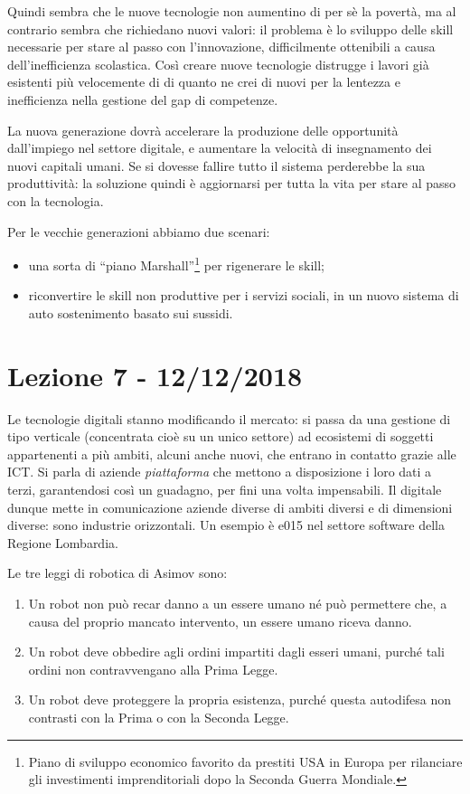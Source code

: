 \documentclass[a4page, 11pt]{article}
\begin{document}
Quindi sembra che le nuove tecnologie non aumentino di per sè la povertà, ma al contrario sembra che richiedano nuovi valori: il problema è lo sviluppo delle skill necessarie per stare al passo con l'innovazione, difficilmente ottenibili a causa dell'inefficienza scolastica.
Così  creare nuove tecnologie distrugge i lavori già esistenti più velocemente di di quanto ne crei di nuovi per la lentezza e inefficienza nella gestione del gap di competenze.

La nuova generazione dovrà accelerare la produzione delle opportunità dall'impiego nel settore digitale, e aumentare la velocità di insegnamento dei nuovi capitali umani.
Se si dovesse fallire tutto il sistema perderebbe la sua produttività: la soluzione quindi è aggiornarsi per tutta la vita per stare al passo con la tecnologia.

Per le vecchie generazioni abbiamo due scenari:
\begin{itemize}
  \item una sorta di ``piano Marshall''\footnote{Piano di sviluppo economico favorito da prestiti USA in Europa per rilanciare gli investimenti imprenditoriali dopo la Seconda Guerra Mondiale.} per rigenerare le skill;
  \item riconvertire le skill non produttive per i servizi sociali, in un nuovo sistema di auto sostenimento basato sui sussidi.
\end{itemize}


\section*{Lezione 7 - 12/12/2018}
Le tecnologie digitali stanno modificando il mercato: si passa da una gestione di tipo verticale (concentrata cioè su un unico settore) ad ecosistemi di soggetti appartenenti a più ambiti, alcuni anche nuovi, che entrano in contatto grazie alle ICT.
Si parla di aziende \textit{piattaforma} che mettono a disposizione i loro dati a terzi, garantendosi così un guadagno, per fini una volta impensabili.
Il digitale dunque mette in comunicazione aziende diverse di ambiti diversi e di dimensioni diverse: sono industrie orizzontali.
Un esempio è e015 nel settore software della Regione Lombardia.

Le tre leggi di robotica di Asimov sono:
\begin{enumerate}
  \def\labelenumi{\arabic{enumi}.}
  \item Un robot non può recar danno a un essere umano né può permettere che, a causa del proprio mancato intervento, un essere umano riceva danno.
  \item Un robot deve obbedire agli ordini impartiti dagli esseri umani, purché tali ordini non contravvengano alla Prima Legge.
  \item Un robot deve proteggere la propria esistenza, purché questa autodifesa non contrasti con la Prima o con la Seconda Legge.
\end{enumerate}
\end{document}
